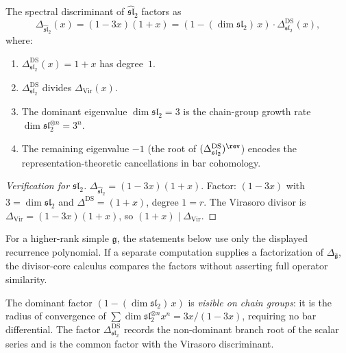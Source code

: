 \begin{theorem}
\label{thm:growth-mode-factorization}
The spectral discriminant of \(\widehat{\mathfrak{sl}}_2\) factors as
\begin{equation}\label{eq:growth-mode-factor}
\Delta_{\widehat{\mathfrak{sl}}_2}(x)
=(1-3x)(1+x)
=(1-(\dim\mathfrak{sl}_2)\,x)\cdot
\Delta^{\mathrm{DS}}_{\mathfrak{sl}_2}(x),
\end{equation}
where:
\begin{enumerate}[label=\textup{(\roman*)}]
\item
\(\Delta^{\mathrm{DS}}_{\mathfrak{sl}_2}(x)=1+x\) has degree~\(1\).
\item
\(\Delta^{\mathrm{DS}}_{\mathfrak{sl}_2}\) divides
\(\Delta_{\mathrm{Vir}}(x)\).
\item
The dominant eigenvalue \(\dim\mathfrak{sl}_2=3\) is the
chain-group growth rate
\(\dim\mathfrak{sl}_2^{\otimes n}=3^n\).
\item
The remaining eigenvalue \(-1\)
\textup{(}the root of
\((\Delta^{\mathrm{DS}}_{\mathfrak{sl}_2})^{\rev}\)\textup{)}
encodes the
representation-theoretic cancellations in bar cohomology.
\end{enumerate}
\end{theorem}

\begin{proof}[Verification for \(\mathfrak{sl}_2\)]
\(\Delta_{\widehat{\mathfrak{sl}}_2}=(1{-}3x)(1{+}x)\).
Factor: \((1{-}3x)\) with \(3=\dim\mathfrak{sl}_2\) and
\(\Delta^{\mathrm{DS}}=(1{+}x)\), degree \(1=r\).
The Virasoro divisor is \(\Delta_{\mathrm{Vir}}=(1{-}3x)(1{+}x)\),
so \((1{+}x)\mid\Delta_{\mathrm{Vir}}\).
\end{proof}

\begin{remark}
For a higher-rank simple \(\mathfrak g\), the statements below use only
the displayed recurrence polynomial.
If a separate computation supplies a factorization of
\(\Delta_{\widehat{\mathfrak g}}\), the divisor-core calculus compares
the factors without asserting full operator similarity.
\end{remark}

\begin{remark}
The dominant factor \((1-(\dim\mathfrak{sl}_2)\,x)\) is
\emph{visible on chain groups}: it is the radius of
convergence of
\(\sum\dim\mathfrak{sl}_2^{\otimes n}x^n
=3x/(1{-}3x)\),
requiring no bar differential.
The factor \(\Delta^{\mathrm{DS}}_{\mathfrak{sl}_2}\) records the
non-dominant branch root of the scalar series and is the common factor
with the Virasoro discriminant.
\end{remark}

